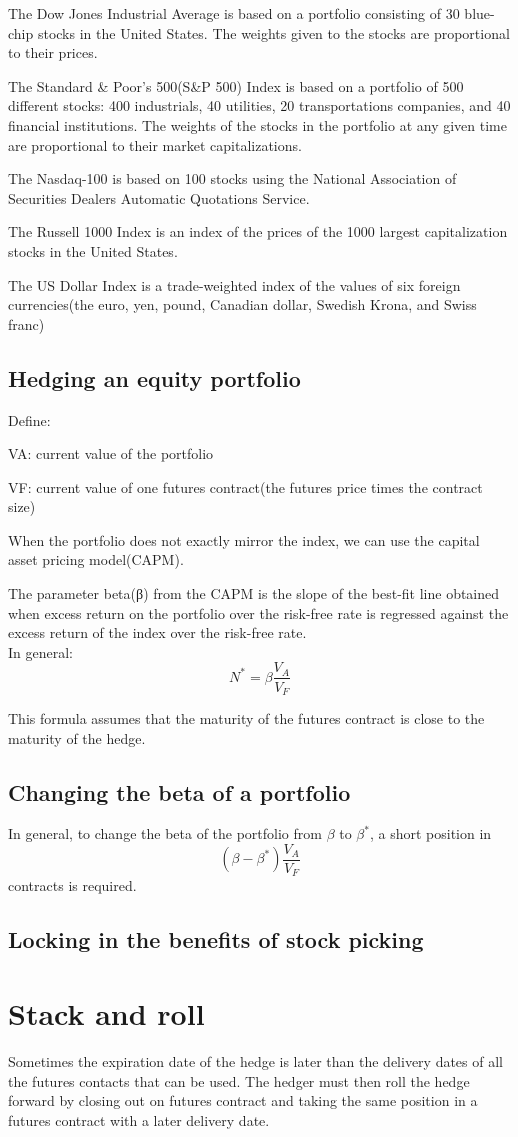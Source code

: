 \documentclass{article}
\begin{document}
The Dow Jones Industrial Average is based on a portfolio consisting of 30 blue-chip stocks in the United States. The weights given to the stocks are proportional to their prices.

The Standard \& Poor's 500(S\&P 500) Index is based on a portfolio of 500 different stocks: 400 industrials, 40 utilities, 20 transportations companies, and 40 financial institutions. The weights of the stocks in the portfolio at any given time are proportional to their market capitalizations.

The Nasdaq-100 is based on 100 stocks using the National Association of Securities Dealers Automatic Quotations Service.

The Russell 1000 Index is an index of the prices of the 1000 largest capitalization stocks in the United States.

The US Dollar Index is a trade-weighted index of the values of six foreign currencies(the euro, yen, pound, Canadian dollar, Swedish Krona, and Swiss franc)

\subsection{Hedging an equity portfolio}
Define:

VA: current value of the portfolio

VF: current value of one futures contract(the futures price times the contract size)

When the portfolio does not exactly mirror the index, we can use the capital asset pricing model(CAPM). 

The parameter beta(β) from the CAPM is the slope of the best-fit line obtained when excess return on the portfolio over the risk-free rate is regressed against the excess return of the index over the risk-free rate.
\\
In general:
\begin{equation}
	N^*=\beta\frac{V_A}{V_F}
\end{equation}

	
This formula assumes that the maturity of the futures contract is close to the maturity of the hedge.

\subsection{Changing the beta of a portfolio}
In general, to change the beta of the portfolio from $ \beta $ to $ \beta^* $, a short position in
\[
(\beta-\beta^*)\frac{V_A}{V_F}
\]
contracts is required.

\subsection{Locking in the benefits of stock picking}

\section{Stack and roll}
Sometimes the expiration date of the hedge is later than the delivery dates of all the futures contacts that can be used. The hedger must then roll the hedge forward by closing out on futures contract and taking the same position in a futures contract with a later delivery date.
\end{document}
